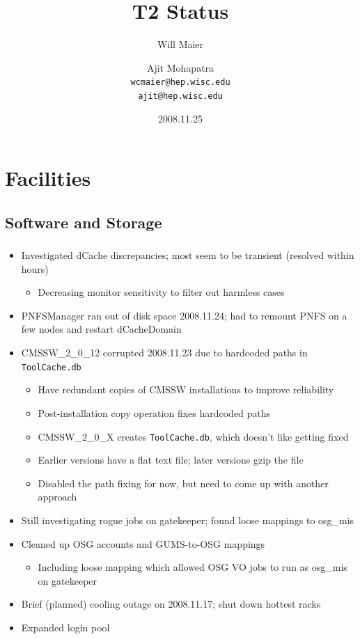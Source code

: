 \documentclass{beamer}
\title{T2 Status}
\author[Maier, Mohapatra]{
    Will Maier \and Ajit Mohapatra\\ 
    {\tt wcmaier@hep.wisc.edu}\\
    {\tt ajit@hep.wisc.edu}}
\institute[Wisconsin]{University of Wisconsin - High Energy Physics}
\date{2008.11.25}
\begin{document}
\begin{frame}
    \titlepage
\end{frame}


\section{Facilities}
\subsection{Software and Storage}
\begin{frame}
\frametitle{}
\begin{itemize}
    \item Investigated dCache discrepancies; most seem to be transient (resolved within hours)
    \begin{itemize}
        \item Decreasing monitor sensitivity to filter out harmless cases
    \end{itemize}
    \item PNFSManager ran out of disk space 2008.11.24; had to remount PNFS on a few nodes and restart dCacheDomain
    \item CMSSW\_2\_0\_12 corrupted 2008.11.23 due to hardcoded paths in {\tt ToolCache.db}
    \begin{itemize}
        \item Have redundant copies of CMSSW installations to improve reliability
        \item Post-installation copy operation fixes hardcoded paths
        \item CMSSW\_2\_0\_X creates {\tt ToolCache.db}, which doesn't like getting fixed
        \item Earlier versions have a flat text file; later versions gzip the file
        \item Disabled the path fixing for now, but need to come up with another approach
    \end{itemize}
    \item Still investigating rogue jobs on gatekeeper; found loose mappings to osg\_mis
    \item Cleaned up OSG accounts and GUMS-to-OSG mappings
    \begin{itemize}
        \item Including loose mapping which allowed OSG VO jobs to run as osg\_mis on gatekeeper
    \end{itemize}
    \item Brief (planned) cooling outage on 2008.11.17; shut down hottest racks
    \item Expanded login pool
\end{itemize}
\end{frame}
\end{document}
